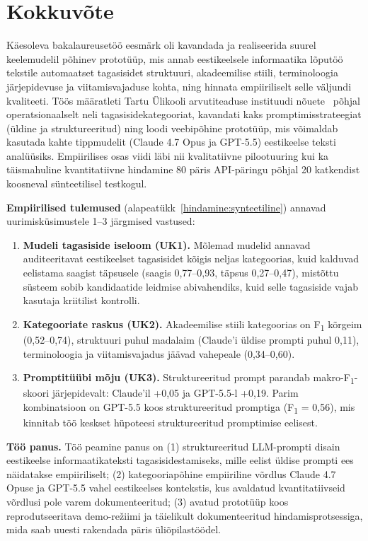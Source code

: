\section{Kokkuvõte} \label{kokkuvõte}

Käesoleva bakalaureusetöö eesmärk oli kavandada ja realiseerida suurel keelemudelil põhinev prototüüp, mis annab eestikeelsele informaatika lõputöö tekstile automaatset tagasisidet struktuuri, akadeemilise stiili, terminoloogia järjepidevuse ja viitamisvajaduse kohta, ning hinnata empiiriliselt selle väljundi kvaliteeti. Töös määratleti Tartu Ülikooli arvutiteaduse instituudi nõuete~\cite{ut_juhend_2024} põhjal operatsionaalselt neli tagasisidekategooriat, kavandati kaks promptimisstrateegiat (üldine ja struktureeritud) ning loodi veebipõhine prototüüp, mis võimaldab kasutada kahte tippmudelit (Claude 4.7 Opus ja GPT-5.5) eestikeelse teksti analüüsiks. Empiirilises osas viidi läbi nii kvalitatiivne pilootuuring kui ka täismahuline kvantitatiivne hindamine 80 päris API-päringu põhjal 20 katkendist koosneval sünteetilisel testkogul.

\textbf{Empiirilised tulemused} (alapeatükk~\ref{hindamine:synteetiline}) annavad uurimisküsimustele 1--3 järgmised vastused:
\begin{enumerate}
    \item \textbf{Mudeli tagasiside iseloom (UK1).} Mõlemad mudelid annavad auditeeritavat eestikeelset tagasisidet kõigis neljas kategoorias, kuid kalduvad eelistama saagist täpsusele (saagis 0,77--0,93, täpsus 0,27--0,47), mistõttu süsteem sobib kandidaatide leidmise abivahendiks, kuid selle tagasiside vajab kasutaja kriitilist kontrolli.
    \item \textbf{Kategooriate raskus (UK2).} Akadeemilise stiili kategoorias on F\textsubscript{1} kõrgeim (0,52--0,74), struktuuri puhul madalaim (Claude'i üldise prompti puhul 0,11), terminoloogia ja viitamisvajadus jäävad vahepeale (0,34--0,60).
    \item \textbf{Promptitüübi mõju (UK3).} Struktureeritud prompt parandab makro-F\textsubscript{1}-skoori järjepidevalt: Claude'il +0,05 ja GPT-5.5-l +0,19. Parim kombinatsioon on GPT-5.5 koos struktureeritud promptiga (F\textsubscript{1} = 0,56), mis kinnitab töö keskset hüpoteesi struktureeritud promptimise eelisest.
\end{enumerate}

\textbf{Töö panus.} Töö peamine panus on (1) struktureeritud LLM-prompti disain eestikeelse informaatikateksti tagasisidestamiseks, mille eelist üldise prompti ees näidatakse empiiriliselt; (2) kategooriapõhine empiiriline võrdlus Claude 4.7 Opuse ja GPT-5.5 vahel eestikeelses kontekstis, kus avaldatud kvantitatiivseid võrdlusi pole varem dokumenteeritud; (3) avatud prototüüp koos reprodutseeritava demo-režiimi ja täielikult dokumenteeritud hindamisprotsessiga, mida saab uuesti rakendada päris üliõpilastöödel.

